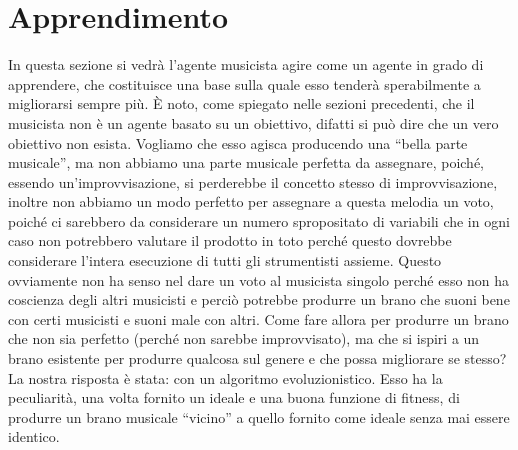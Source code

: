 \section{Apprendimento}

In questa sezione si vedrà l'agente musicista agire come un agente in grado di apprendere, che costituisce una base sulla quale esso tenderà sperabilmente a migliorarsi sempre più.
È noto, come spiegato nelle sezioni precedenti, che il musicista non è un agente basato su un obiettivo, difatti si può dire che un vero obiettivo non esista.
Vogliamo che esso agisca producendo una ``bella parte musicale'', ma non abbiamo una parte musicale perfetta da assegnare, poiché, essendo un'improvvisazione, si perderebbe il concetto stesso di improvvisazione, inoltre non abbiamo un modo perfetto per assegnare a questa melodia un voto, poiché ci sarebbero da considerare un numero spropositato di variabili che in ogni caso non potrebbero valutare il prodotto in toto perché questo dovrebbe considerare l'intera esecuzione di tutti gli strumentisti assieme.
Questo ovviamente non ha senso nel dare un voto al musicista singolo perché esso non ha coscienza degli altri musicisti e perciò potrebbe produrre un brano che suoni bene con certi musicisti e suoni male con altri.
Come fare allora per produrre un brano che non sia perfetto (perché non sarebbe improvvisato), ma che si ispiri a un brano esistente per produrre qualcosa sul genere e che possa migliorare se stesso?
\newline
La nostra risposta è stata: con un algoritmo evoluzionistico.
Esso ha la peculiarità, una volta fornito un ideale e una buona funzione di fitness, di produrre un brano musicale ``vicino'' a quello fornito come ideale senza mai essere identico.

